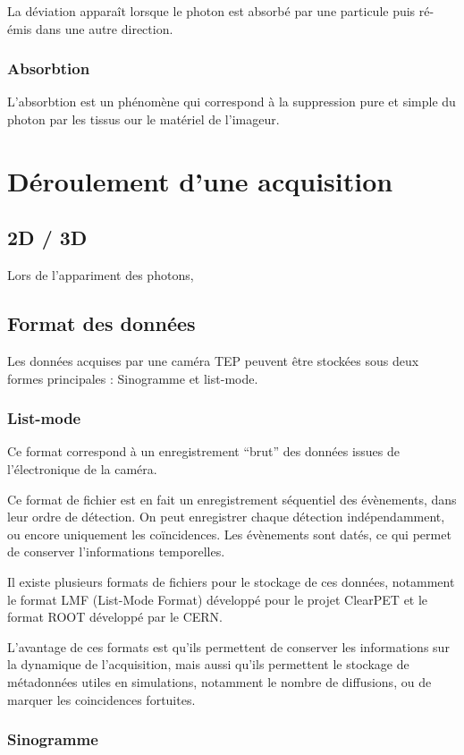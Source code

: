 La déviation apparaît lorsque le photon est absorbé par une particule puis ré-émis dans une autre direction. 	
		
		\subsection{Absorbtion}

L'absorbtion est un phénomène qui correspond à la suppression pure et simple du photon par les tissus our le matériel de l'imageur.

\chapter{Déroulement d'une acquisition}
	\section{2D / 3D}

Lors de l'appariment des photons, 


	\section{Format des données}
Les données acquises par une caméra TEP peuvent être stockées sous deux formes principales : Sinogramme et list-mode.
		\subsection{List-mode}

Ce format correspond à un enregistrement ``brut'' des données issues de l'électronique de la caméra.

Ce format de fichier est en fait un enregistrement séquentiel des évènements, dans leur ordre de détection. On peut enregistrer chaque détection indépendamment, ou encore uniquement les coïncidences. Les évènements sont datés, ce qui permet de conserver l'informations temporelles. 

Il existe plusieurs formats de fichiers pour le stockage de ces données, notamment le format LMF (List-Mode Format) développé pour le projet ClearPET et le format ROOT développé par le CERN. 

L'avantage de ces formats est qu'ils permettent de conserver les informations sur la dynamique de l'acquisition, mais aussi qu'ils permettent le stockage de métadonnées utiles en simulations, notamment le nombre de diffusions, ou de marquer les coincidences fortuites.

		\subsection{Sinogramme}

